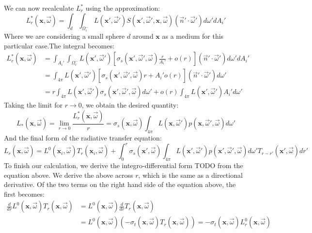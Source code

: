 We can now recalculate $L_r^*$ using the approximation:
$$
L_r^*(\mathbf{x}, \vec{\omega}) = \int_{d} \int_{\Omega^-_i} L(\mathbf{x}', \vec{\omega}')  S(\mathbf{x}', \vec{\omega}', \mathbf{x}, \vec{\omega}) (\vec{n}' \cdot \vec{\omega}') d\omega' dA_i'
$$
Where we are considering a small sphere $d$ around $\mathbf{x}$ as a medium for this particular case.The integral becomes:
\begin{equation}
\begin{split}
L_r^*(\mathbf{x}, \vec{\omega}) &= \int_{A_i'} \int_{\Omega^-_i} L(\mathbf{x}', \vec{\omega}')  [\sigma_s(\mathbf{x}', \vec{\omega}', \vec{\omega}) \frac{r}{A_i'} + o(r)] (\vec{n}' \cdot \vec{\omega}') d\omega' dA_i'  \\
&= \int_{4\pi}  L(\mathbf{x}', \vec{\omega}')  [\sigma_s(\mathbf{x}', \vec{\omega}', \vec{\omega}) r + A_i' o(r)] (\vec{n}' \cdot \vec{\omega}') d\omega'\\
&= r \int_{4\pi}  L(\mathbf{x}', \vec{\omega}')  \sigma_s(\mathbf{x}', \vec{\omega}', \vec{\omega}) d\omega' + o(r) \int_{4\pi}  L(\mathbf{x}', \vec{\omega}') A_i'   d\omega'
\end{split}
\end{equation}
Taking the limit for $r\rightarrow 0$, we obtain the desired quantity:
$$
L_*(\mathbf{x}, \vec{\omega}) = \lim_{r\rightarrow 0} \frac{L_r^*(\mathbf{x}, \vec{\omega})}{r} = \sigma_s(\mathbf{x}, \vec{\omega}) \int_{4\pi} L(\mathbf{x}, \vec{\omega}') p(\mathbf{x}, \vec{\omega}', \vec{\omega})   d\omega' 
$$
And the final form of the radiative transfer equation:
$$
L_r(\mathbf{x}, \vec{\omega}) =  L^0(\mathbf{x}_i, \vec{\omega}) T_r(\mathbf{x}_i, \vec{\omega}) + \int_0^r \sigma_s(\mathbf{x}', \vec{\omega}) \int_{4\pi} L(\mathbf{x}', \vec{\omega}') p(\mathbf{x}', \vec{\omega}', \vec{\omega})  d\omega' T_{r-r'}(\mathbf{x}', \vec{\omega})  dr'
$$
To finish our calculation, we derive the integro-differential form TODO from the equation above. We derive the above across $r$, which is the same as a directional derivative. Of the two terms on the right hand side of the equation above, the first becomes:
\begin{equation}
\begin{split}
\frac{d}{dr} L^0(\mathbf{x}, \vec{\omega}) T_r(\mathbf{x}, \vec{\omega}) &= L^0(\mathbf{x}, \vec{\omega}) \frac{d}{dr}  T_r(\mathbf{x}, \vec{\omega}) \\
&= L^0(\mathbf{x}, \vec{\omega}) (-\sigma_t(\mathbf{x}, \vec{\omega}) T_r(\mathbf{x}, \vec{\omega})) = -\sigma_t(\mathbf{x}, \vec{\omega}) L_r^0(\mathbf{x}, \vec{\omega})
\end{split}
\end{equation}
